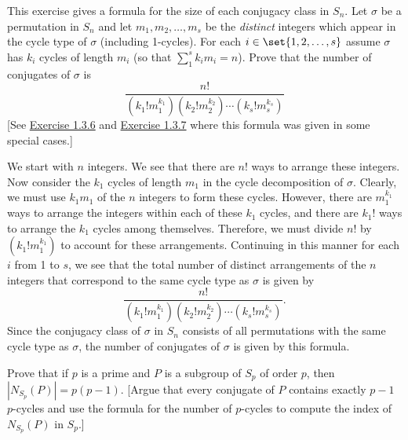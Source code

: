 \begin{specialexercise} \label{ex4.3.33}
	This exercise gives a formula for the size of each conjugacy class in $S_n$. Let $\sigma$ be a permutation in $S_n$ and let $m_1, m_2, \ldots, m_s$ be the \emph{distinct} integers which appear in the cycle type of $\sigma$ (including 1-cycles). For each $i \in \set{1, 2, \ldots, s}$ assume $\sigma$ has $k_i$ cycles of length $m_i$ (so that $\sum_1^s k_im_i = n$). Prove that the number of conjugates of $\sigma$ is
	\[\frac{n!}{(k_1!m_1^{k_1})(k_2!m_2^{k_2}) \cdots (k_s!m_s^{k_s})}\]
	[See \hyperref[ex1.3.6]{Exercise 1.3.6} and \hyperref[ex1.3.7]{Exercise 1.3.7} where this formula was given in some special cases.]
\end{specialexercise}

\begin{sol}
	We start with $n$ integers. We see that there are $n!$ ways to arrange these integers. Now consider the $k_1$ cycles of length $m_1$ in the cycle decomposition of $\sigma$. Clearly, we must use $k_1m_1$ of the $n$ integers to form these cycles. However, there are $m_1^{k_1}$ ways to arrange the integers within each of these $k_1$ cycles, and there are $k_1!$ ways to arrange the $k_1$ cycles among themselves. Therefore, we must divide $n!$ by $(k_1!m_1^{k_1})$ to account for these arrangements. Continuing in this manner for each $i$ from 1 to $s$, we see that the total number of distinct arrangements of the $n$ integers that correspond to the same cycle type as $\sigma$ is given by
	\[\frac{n!}{(k_1!m_1^{k_1})(k_2!m_2^{k_2}) \cdots (k_s!m_s^{k_s})}.\]
	Since the conjugacy class of $\sigma$ in $S_n$ consists of all permutations with the same cycle type as $\sigma$, the number of conjugates of $\sigma$ is given by this formula.
\end{sol}

\begin{exercise}
	\label{ex4.3.34} Prove that if $p$ is a prime and $P$ is a subgroup of $S_p$ of order $p$, then $|N_{S_p}(P)| = p(p - 1)$. [Argue that every conjugate of $P$ contains exactly $p - 1$ $p$-cycles and use the formula for the number of $p$-cycles to compute the index of $N_{S_p}(P)$ in $S_p$.]
\end{exercise}

